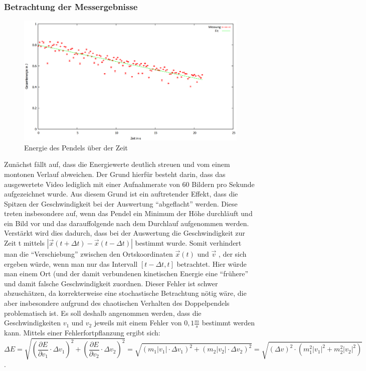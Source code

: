 \subsubsection{Betrachtung der Messergebnisse}

\begin{figure}
        \includegraphics[width=.9\textwidth]{images/E_ueber_t.png}
\caption{Energie des Pendels über der Zeit}
\label{E_ueber_t}
\end{figure}


Zunächst fällt auf, dass die Energiewerte deutlich streuen und vom einem montonen Verlauf abweichen. Der Grund hierfür besteht darin, dass das ausgewertete Video lediglich mit einer Aufnahmerate von 60 Bildern pro Sekunde aufgezeichnet wurde. Aus diesem Grund ist ein auftretender Effekt, dass die Spitzen der Geschwindigkeit bei der Auswertung \enquote{abgeflacht} werden. Diese treten insbesondere auf, wenn das Pendel ein Minimum der Höhe durchläuft und ein Bild vor und das darauffolgende nach dem Durchlauf aufgenommen werden. Verstärkt wird dies dadurch, dass bei der Auswertung die Geschwindigkeit zur Zeit t mittels $ |\vec{x}(t+\Delta t) - \vec{x}(t-\Delta t)| $ bestimmt wurde. Somit verhindert man die \enquote{Verschiebung} zwischen den Ortskoordinaten $  \vec{x} (t) $ und $ \vec{v} $ , der sich ergeben würde, wenn man nur das Intervall $ [t - \Delta t, t] $ betrachtet. Hier würde man einem Ort (und der damit verbundenen kinetischen Energie eine \enquote{frühere} und damit falsche Geschwindigkeit zuordnen. 
Dieser Fehler ist schwer abzuschätzen, da korrekterweise eine stochastische Betrachtung nötig wäre, die aber insbesondere aufgrund des chaotischen Verhalten des Doppelpendels problematisch ist. 
Es soll deshalb angenommen werden, dass die Geschwindigkeiten $ v_1 $ und $ v_2 $ jeweils mit einem Fehler von $ 0,1 \frac{m}{s} $ bestimmt werden kann. Mittels einer Fehlerfortpflanzung ergibt sich: 
\begin{equation}
\Delta E = \sqrt{(\frac{\partial E}{\partial v_1} \cdot \Delta v_1)^2 + (\frac{\partial E}{\partial v_2} \cdot \Delta v_2)^2} = \sqrt{(m_1 |v_1| \cdot \Delta v_1)^2 + (m_2 |v_2| \cdot \Delta v_2)^2} = \sqrt{(\Delta v)^2 \cdot (m_1^2 |v_1|^2 + m_2^2 |v_2|^2)}
\end{equation}. \\

